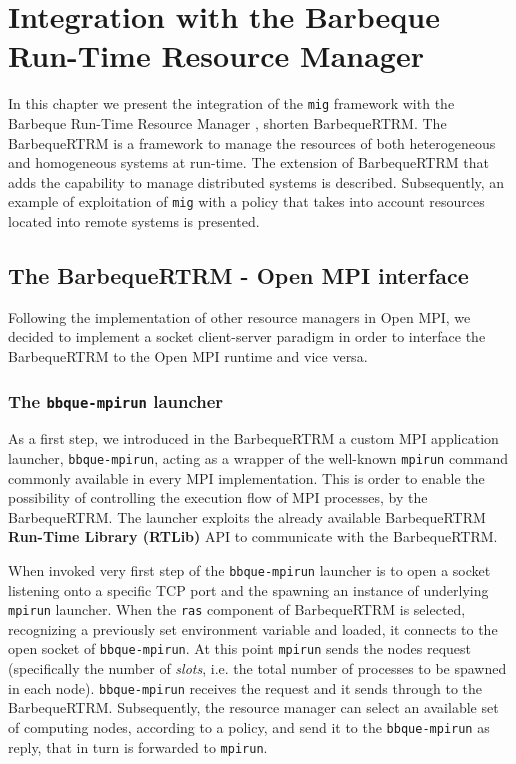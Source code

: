 \newtheorem{PolicyDef}{Definition}


\chapter{Integration with the Barbeque Run-Time Resource Manager}
\label{cap:integration}
In this chapter we present the integration of the \texttt{mig} framework
with the Barbeque Run-Time Resource Manager \cite{bellasi2012rtrm},
shorten BarbequeRTRM. The BarbequeRTRM is a framework to manage the resources
of both heterogeneous and homogeneous systems at run-time. The extension of BarbequeRTRM that adds the capability
to manage distributed systems is described. Subsequently, an example of exploitation of
\texttt{mig} with a policy that takes into account
resources located into remote systems is presented.

\section{The BarbequeRTRM - Open MPI interface}
Following the implementation of other resource managers in Open MPI, we decided
to implement a socket client-server paradigm in order to interface the BarbequeRTRM to the Open MPI runtime and vice versa.

\subsection{The \texttt{bbque-mpirun} launcher}

As a first step, we introduced in the BarbequeRTRM a custom MPI application
launcher, \texttt{bbque-mpirun}, acting as a wrapper of the well-known
\texttt{mpirun} command commonly available in every MPI implementation. This
is order to enable the possibility of controlling the execution flow of MPI processes, by the BarbequeRTRM. 
The launcher exploits the already available BarbequeRTRM 
\textbf{Run-Time Library (RTLib)}
API to communicate with the BarbequeRTRM.

When invoked very first step of the \texttt{bbque-mpirun} launcher is
to open a socket listening onto a specific TCP port and the spawning
an instance of underlying \texttt{mpirun} launcher. When the \texttt{ras}
component of BarbequeRTRM is selected, recognizing a previously set environment variable and loaded, it connects
to the open socket of \texttt{bbque-mpirun}. At this point \texttt{mpirun}
sends the nodes request (specifically the number of \emph{slots}, i.e. the
total number of processes to be spawned in each node). \texttt{bbque-mpirun}
receives the request and it sends through to the
BarbequeRTRM. Subsequently, the resource manager can select an available set
of computing nodes, according to a policy, and send it to the  \texttt{bbque-mpirun} as reply,
that in turn is forwarded to \texttt{mpirun}.

